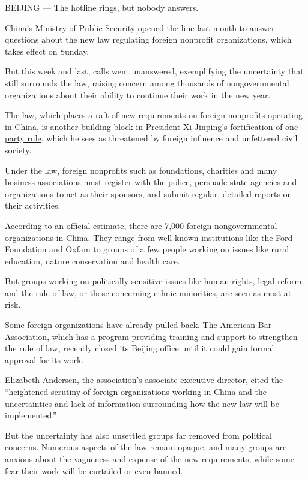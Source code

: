 BEIJING --- The hotline rings, but nobody answers.

China's Ministry of Public Security opened the line last month to answer
questions about the new law regulating foreign nonprofit organizations,
which takes effect on Sunday.

But this week and last, calls went unanswered, exemplifying the
uncertainty that still surrounds the law, raising concern among
thousands of nongovernmental organizations about their ability to
continue their work in the new year.

The law, which places a raft of new requirements on foreign nonprofits
operating in China, is another building block in President Xi Jinping's
\href{http://www.nytimes.com/2016/10/28/world/asia/xi-jinping-china.html}{fortification
of one-party rule}, which he sees as threatened by foreign influence and
unfettered civil society.

Under the law, foreign nonprofits such as foundations, charities and
many business associations must register with the police, persuade state
agencies and organizations to act as their sponsors, and submit regular,
detailed reports on their activities.

According to an official estimate, there are 7,000 foreign
nongovernmental organizations in China. They range from well-known
institutions like the Ford Foundation and Oxfam to groups of a few
people working on issues like rural education, nature conservation and
health care.

But groups working on politically sensitive issues like human rights,
legal reform and the rule of law, or those concerning ethnic minorities,
are seen as most at risk.

Some foreign organizations have already pulled back. The American Bar
Association, which has a program providing training and support to
strengthen the rule of law, recently closed its Beijing office until it
could gain formal approval for its work.

Elizabeth Andersen, the association's associate executive director,
cited the ``heightened scrutiny of foreign organizations working in
China and the uncertainties and lack of information surrounding how the
new law will be implemented.''

But the uncertainty has also unsettled groups far removed from political
concerns. Numerous aspects of the law remain opaque, and many groups are
anxious about the vagueness and expense of the new requirements, while
some fear their work will be curtailed or even banned.

